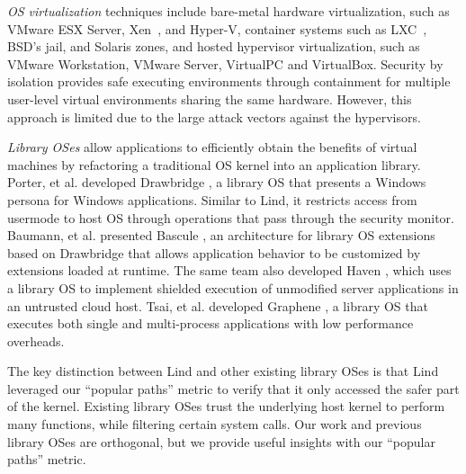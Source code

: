 \textit{OS virtualization}
techniques include
bare-metal hardware virtualization, such as VMware ESX Server, Xen~\cite{Xen-03},
and Hyper-V, container systems such as LXC~\cite{LXC}, BSD's jail, and Solaris zones, and
hosted hypervisor virtualization, such as VMware
Workstation, VMware Server, VirtualPC and VirtualBox.
Security by isolation \cite{Qubes, Overshadow, SecureVM, HypSec}
provides safe executing environments through containment for multiple
user-level virtual environments sharing the same hardware.
However, this approach is limited due to
the large attack vectors against the hypervisors.

\textit{Library OSes}
allow applications to efficiently obtain the benefits of virtual machines
by refactoring a traditional OS kernel into an application library.
Porter, et al. developed Drawbridge \cite{Drawbridge-11},
a library OS
that presents a Windows persona for %
Windows applications. Similar to Lind,
it restricts access from usermode to host OS through
operations that pass through the security monitor.
%
%
Baumann, et al. presented Bascule \cite{Bascule}, an architecture for library OS extensions
based on Drawbridge that allows application behavior to be customized by
extensions loaded at runtime. The same team also developed Haven \cite{Haven},
which uses a library OS to implement
shielded execution of unmodified server applications
in an untrusted cloud host.
Tsai, et al. developed Graphene \cite{Graphene-14}, a library OS that
executes both single and
multi-process applications with low performance overheads.

The key distinction between Lind and other existing library OSes is that 
Lind leveraged our ``popular paths'' metric to verify that it only accessed the safer part of the kernel. 
Existing library OSes trust the underlying host kernel to perform many functions, 
while filtering certain system calls. 
Our work and previous library OSes are orthogonal, but we provide useful insights with our ``popular paths'' metric. 
